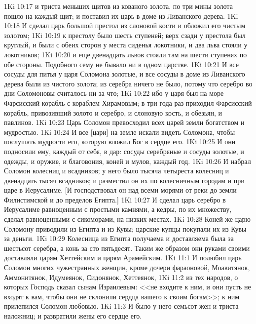 \vs 1Ki 10:17 и триста меньших щитов из кованого золота, по три мины золота пошло на каждый щит; и поставил их царь в доме из Ливанского дерева.
\vs 1Ki 10:18 И сделал царь большой престол из слоновой кости и обложил его чистым золотом;
\vs 1Ki 10:19 к престолу было шесть ступеней; верх сзади у престола был круглый, и были с обеих сторон у места сиденья локотники, и два льва стояли у локотников;
\vs 1Ki 10:20 и еще двенадцать львов стояли там на шести ступенях по обе стороны. Подобного сему не бывало ни в одном царстве.
\vs 1Ki 10:21 И все сосуды для питья у царя Соломона  золотые, и все сосуды в доме из Ливанского дерева были из чистого золота; из серебра ничего не было, потому что серебро во дни Соломоновы считалось ни за что;
\vs 1Ki 10:22 ибо у царя был на море Фарсисский корабль с кораблем Хирамовым; в три года раз приходил Фарсисский корабль, привозивший золото и серебро, и слоновую кость, и обезьян, и павлинов.
\rsbpar\vs 1Ki 10:23 Царь Соломон превосходил всех царей земли богатством и мудростью.
\vs 1Ki 10:24 И все [цари] на земле искали видеть Соломона, чтобы послушать мудрости его, которую вложил Бог в сердце его.
\vs 1Ki 10:25 И они подносили ему, каждый от себя, в дар: сосуды серебряные и сосуды золотые, и одежды, и оружие, и благовония, коней и мулов, каждый год.
\vs 1Ki 10:26 И набрал Соломон колесниц и всадников; у него было тысяча четыреста колесниц и двенадцать тысяч всадников; и разместил он их по колесничным городам и при царе в Иерусалиме. [И господствовал он над всеми морями от реки до земли Филистимской и до пределов Египта.]
\vs 1Ki 10:27 И сделал царь серебро в Иерусалиме равноценным с простыми камнями, а кедры, по их множеству, сделал равноценными с сикоморами,  на низких местах.
\vs 1Ki 10:28 Коней же царю Соломону приводили из Египта и из Кувы; царские купцы покупали их из Кувы за деньги.
\vs 1Ki 10:29 Колесница из Египта получаема и доставляема была за шестьсот  серебра, а конь за сто пятьдесят. Таким же образом они руками своими доставляли  царям Хеттейским и царям Арамейским.
\vs 1Ki 11:1 И полюбил царь Соломон многих чужестранных женщин, кроме дочери фараоновой, Моавитянок, Аммонитянок, Идумеянок, Сидонянок, Хеттеянок,
\vs 1Ki 11:2 из тех народов, о которых Господь сказал сынам Израилевым: <<не входите к ним, и они пусть не входят к вам, чтобы они не склонили сердца вашего к своим богам>>; к ним прилепился Соломон любовью.
\vs 1Ki 11:3 И было у него семьсот жен и триста наложниц; и развратили жены его сердце его.
